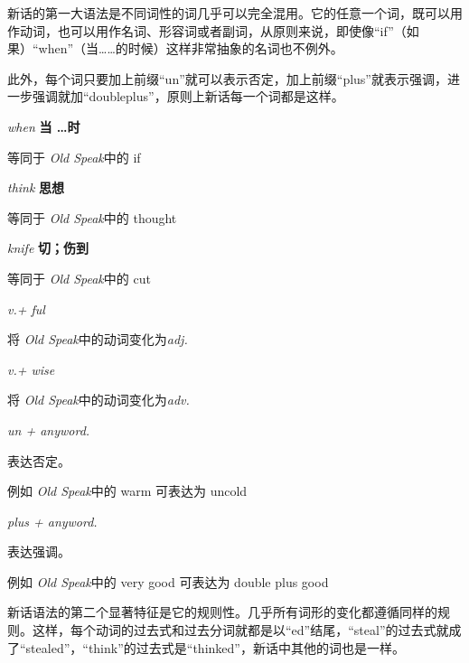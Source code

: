 \documentclass[lang=cn, color=black]{elegantbook}
\newenvironment{word}[2]{
    \noindent \textit{#1} \quad \textbf{#2} \\
    \indent
}{}
\newcommand{\os}{\textit{Old Speak}}
\newcommand{\eos}[1]{等同于 \os 中的 #1}
\newcommand{\vocab}{\textit{v.}}
\newcommand{\adj}{\textit{adj.}}
\newcommand{\adv}{\textit{adv.}}
\newcommand{\anyword}{\textit{anyword.}}
\begin{document}

                新话的第一大语法是不同词性的词几乎可以完全混用。它的任意一个词，既可以用作动词，也可以用作名词、形容词或者副词，从原则来说，即使像“if”（如果）“when”（当……的时候）这样非常抽象的名词也不例外。

                此外，每个词只要加上前缀“un”就可以表示否定，加上前缀“plus”就表示强调，进一步强调就加“doubleplus”，原则上新话每一个词都是这样。

                \begin{multicols}{2}
                    \begin{word}{when}{当 \dots 时}
                        \eos{if}
                    \end{word}
    
                    \begin{word}{think}{思想}
                        \eos{thought}
                    \end{word}
    
                    \begin{word}{knife}{切；伤到}
                        \eos{cut}
                    \end{word}
    
                    \begin{word}{\vocab + ful}{}
                        将 \os 中的动词变化为\adj
                    \end{word}

                    \begin{word}{\vocab + wise}{}
                        将 \os 中的动词变化为\adv
                    \end{word}

                    \begin{word}{un + \anyword}{}
                        表达否定。
                        
                        例如 \os 中的 warm 可表达为 uncold
                    \end{word}

                    \begin{word}{plus + \anyword}{}
                        表达强调。
                        
                        例如 \os 中的 very good 可表达为 double plus good
                    \end{word}
                \end{multicols}

                新话语法的第二个显著特征是它的规则性。几乎所有词形的变化都遵循同样的规则。这样，每个动词的过去式和过去分词就都是以“ed”结尾，“steal”的过去式就成了“stealed”，“think”的过去式是“thinked”，新话中其他的词也是一样。
\end{document}
